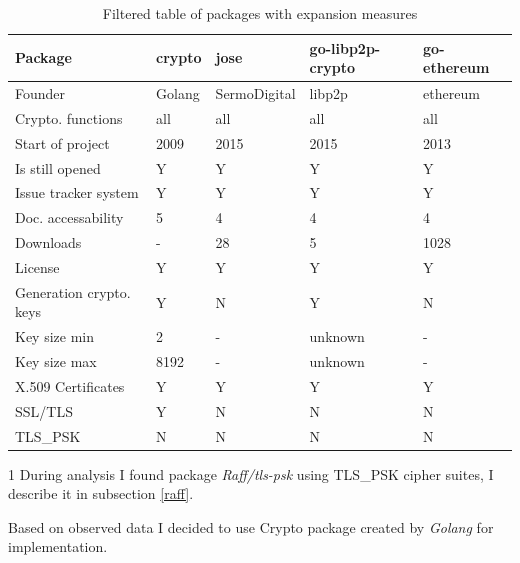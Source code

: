 \documentclass[
  digital, %
  notable,   %
  lof,     %
  lot,     %
]{fithesis3}
\begin{document}
\begin{table}[th]
\caption{Filtered table of packages with expansion measures} 
\begin{threeparttable}
\begin{tabular}{|Q{2.3cm}|Q{1.1cm} Q{2.4cm} Q{2.4cm} Q{2.4cm}|}
\hline \hline
Package & crypto & jose & go-libp2p-crypto & go-ethereum \\ [2ex]
\hline \hline
Founder & Golang & SermoDigital & libp2p & ethereum \\ [2ex]
Crypto. functions & all & all & all & all \\ [3.3ex]
Start of project & 2009 & 2015 & 2015 & 2013 \\ [3.3ex]
Is still opened & Y & Y & Y & Y \\ [3.3ex]
Issue tracker system & Y & Y & Y & Y \\ [3.3ex]
Doc. accessability & 5 & 4 & 4 & 4 \\ [3.3ex]
Downloads & - & 28 & 5 & 1028 \\ [2ex]
License & Y & Y & Y & Y \\ [2ex]
Generation crypto. keys & Y & N & Y & N \\ [3.3ex]
Key size min & 2 & - & unknown & - \\ [3.3ex]
Key size max & 8192 & - & unknown & - \\ [3.3ex]
X.509 Certificates & Y & Y & Y & Y \\ [3.3ex]
SSL/TLS & Y & N & N & N \\ [2ex]
TLS\_PSK  & N & N & N & N \\ [2ex]
\hline
\end{tabular}
\begin{tablenotes}
\item[1] During analysis I found package \textit{Raff/tls-psk} using TLS\_PSK cipher suites, I describe it in subsection \ref{raff}.%
\end{tablenotes}
\end{threeparttable}
\label{table:analysis23} 
\end{table}

\nocite{crypto}
\nocite{jose}
\nocite{libp2p}
\nocite{ethereum}

Based on observed data I decided to use Crypto package created by \textit{Golang} for 
implementation. 
\end{document}
